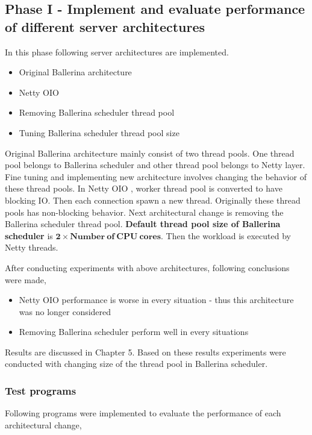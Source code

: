 \subsection{Phase I - Implement and evaluate performance of different server architectures}

In this phase following server architectures are implemented. 

 \begin{itemize}
 	\item Original Ballerina architecture
 	\item Netty OIO
 	\item Removing Ballerina scheduler thread pool
 	\item Tuning Ballerina scheduler thread pool size
 \end{itemize} 

Original Ballerina architecture mainly consist of two thread pools. One thread pool belongs to Ballerina scheduler and other thread pool belongs to Netty layer. Fine tuning and implementing new architecture involves changing the behavior of these thread pools. In Netty OIO , worker thread pool is converted to have blocking IO. Then each connection spawn a new thread. Originally these thread pools has non-blocking behavior. Next architectural change is removing the Ballerina scheduler thread pool. \textbf{Default thread pool size of Ballerina scheduler} is \textbf{$ \boldsymbol{2} \times \boldsymbol{Number\: of\: CPU\: cores}$}. Then the workload is executed by Netty threads. 

After conducting experiments with above architectures, following conclusions were made,
 
\begin{itemize}
	\item Netty OIO performance is worse in every situation - thus this architecture was no longer considered
	\item Removing Ballerina scheduler perform well in every situations
\end{itemize} 

Results are discussed in Chapter 5. Based on these results experiments were conducted with changing size of the thread pool in Ballerina scheduler.

\subsubsection{Test programs}

Following programs were implemented to evaluate the performance of each architectural change,

